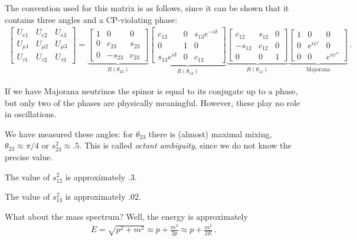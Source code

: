 \documentclass[main.tex]{subfiles}
\begin{document}
The convention used for this matrix is as follows, since it can be shown that it contains three angles and a CP-violating phase:
%
\begin{align}
\left[\begin{array}{ccc}
U_{e1} & U_{e2} & U_{e3} \\ 
U_{\mu 1} & U_{\mu 2} & U_{\mu 3} \\ 
U_{\tau 1} & U_{\tau 2} & U_{\tau 3} 
\end{array}\right]
= 
\underbrace{\left[\begin{array}{ccc}
1 & 0 & 0 \\ 
0 & c_{23} & s_{23} \\ 
0 & -s_{23} & c_{23}
\end{array}\right]}_{R(\theta_{23})}
\underbrace{\left[\begin{array}{ccc}
c_{13}  & 0 & s_{13} e^{-i \delta } \\ 
0 & 1 & 0 \\ 
s_{13} e^{i \delta } & 0 & c_{13} 
\end{array}\right]}_{R(\theta_{13})} 
\underbrace{\left[\begin{array}{ccc}
c_{12}  & s_{12}  & 0 \\ 
-s_{12}  & c_{12}  & 0 \\ 
0 & 0 & 1
\end{array}\right]}_{R(\theta_{12})}
\underbrace{\left[\begin{array}{ccc}
1 & 0 & 0 \\ 
0 & e^{i \psi ' } & 0 \\ 
0 & 0 & e^{i \psi ''}
\end{array}\right]}_{\text{Majorana}}
\,.
\end{align}

If we have Majorana neutrinos the spinor is equal to its conjugate up to a phase, but only two of the phases are physically meaningful. 
However, these play no role in oscillations.

We have measured these angles: for \(\theta_{23}\) there is (almost) maximal mixing, \(\theta_{23} \approx \pi /4\) or \(s^2_{23} \approx \num{.5}\). 
This is called \emph{octant ambiguity}, since we do not know the precise value. 

The value of \(s^2_{12}\) is approximately \(\num{.3}\). 

The value of \(s^2_{13}\) is approximately \(\num{.02}\). 

What about the mass spectrum? 
Well, the energy is approximately 
%
\begin{align}
E = \sqrt{p^2 + m^2} 
\approx p + \frac{m^2}{2 p}
\approx p + \frac{m^2}{2E}
\,.
\end{align}
\end{document}
